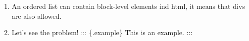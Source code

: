 \begin{enumerate}
\def\labelenumi{\arabic{enumi}.}
\tightlist
\item
  An ordered list can contain block-level elements ind html, it means
  that divs are also allowed.
\item
  Let's see the problem! ::: \{.example\} This is an example. :::
\end{enumerate}
